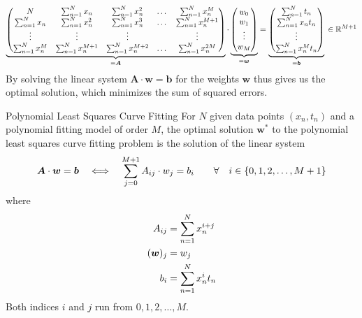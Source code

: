 \documentclass[11pt,DINA4, fleqn]{amsart}
\def\vw{\boldsymbol{w}\xspace}
\def\vb{\boldsymbol{b}\xspace}
\def\mA{\boldsymbol{A}\xspace}
\begin{document}
\begin{align}
\underbrace{
\begin{pmatrix}
N & \sum\displaylimits_{n = 1}^{N}x_n & \sum\displaylimits_{n = 1}^{N}x_n^2 & \dots & \sum\displaylimits_{n = 1}^{N}x_n^M \\
\sum\displaylimits_{n = 1}^{N}x_n & \sum\displaylimits_{n = 1}^{N}x_n^2 &
\sum\displaylimits_{n = 1}^{N}x_n^3 & \dots &
\sum\displaylimits_{n = 1}^{N}x_n^{M + 1} \\
\vdots & \vdots & \vdots && \vdots \\ 
\sum\displaylimits_{n = 1}^{N}x_n^M &
\sum\displaylimits_{n = 1}^{N}x_n^{M+1} &
\sum\displaylimits_{n = 1}^{N}x_n^{M+2} &
\dotsc &  \sum\displaylimits_{n = 1}^{N}x_n^{2M}
\end{pmatrix}}_{=\mA} \cdot
\underbrace{\begin{pmatrix}
w_0 \\ w_1 \\ \vdots \\ w_M
\end{pmatrix}}_{=\vw}
=
\underbrace{\begin{pmatrix}
\sum\displaylimits_{n = 1}^{N} t_n \\
\sum\displaylimits_{n = 1}^{N} x_n t_n \\
\vdots \\
\sum\displaylimits_{n = 1}^{N} x_n^M t_n 
\end{pmatrix}}_{=\vb} \, \in \mathbb{R}^{M+1}
\end{align}
By solving the linear system $\mA \cdot \vw = \vb$ for the weights $\vw$ thus gives us the optimal solution, which minimizes the sum of squared errors.

\begin{mybox_tc3}{Polynomial Least Squares Curve Fitting}
	For $N$ given data points $(x_n, t_n)$ and a polynomial fitting model of order $M$,
	the optimal solution $\vw^*$ to the polynomial least squares curve fitting problem is the solution of the linear system
	\begin{align}
	\mA \cdot \vw = \vb \quad \Longleftrightarrow \quad \sum \displaylimits_{j = 0}^{M + 1} A_{ij} \cdot w_j = b_i  \qquad \forall\quad i \in \{0, 1, 2, \dotsc, M+1\}
	\end{align}
	where
	\begin{align}
	A_{ij} &= \sum \displaylimits_{n = 1}^{N} x_n^{i + j} \\
	(\vw)_j &= w_j \\
	b_i &= \sum \displaylimits_{n = 1}^{N} x_n^{i} t_n
	\end{align}
	Both indices $i$ and $j$ run from $0, 1, 2, \dotsc, M$.
\end{mybox_tc3}
\end{document}
